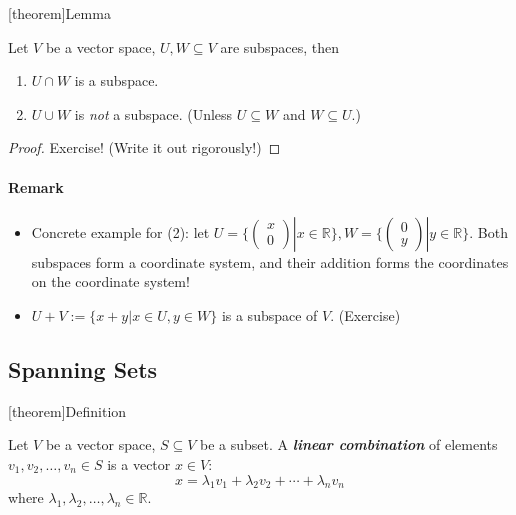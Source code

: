 \documentclass[12pt]{report}
\theoremstyle{definition}
\begin{document}
[theorem]{Lemma}
\begin{union and intersection of subspaces}
    Let $V$ be a vector space, $U, W \subseteq V$ are subspaces, then
    \begin{enumerate}[label = (\arabic*)]
        \item $U \cap W$ is a subspace.
        \item $U \cup W$ is \emph{not} a subspace.
            (Unless $U \subseteq W$ and $W \subseteq U$.)
    \end{enumerate}
\end{union and intersection of subspaces}

\begin{proof}
    Exercise! (Write it out rigorously!)
\end{proof}

\paragraph{Remark}
\begin{itemize}
        \item 
    Concrete example for (2): let $U = \{\begin{pmatrix}
            x \\
            0
    \end{pmatrix} | x \in \mathbb{R}\}, W = \{\begin{pmatrix}
            0 \\
            y
    \end{pmatrix} | y \in \mathbb{R}\}$. Both subspaces form a coordinate system,
    and their addition forms the coordinates on the coordinate system!

    \item $U + V := \{x + y | x \in U, y \in W\}$ is a subspace of $V$. (Exercise)
\end{itemize}

\subsection{Spanning Sets}

[theorem]{Definition}
\begin{spanning sets}
    Let $V$ be a vector space, $S \subseteq V$ be a subset.
    A \textbf{\emph{linear combination}} of elements $v_1, v_2, \ldots, v_n \in S$ is a vector $x \in V$:\[
        x = \lambda_1 v_1 + \lambda_2 v_2 + \cdots + \lambda_n v_n
    \]where $\lambda_1, \lambda_2, \ldots, \lambda_n \in \mathbb{R}$.
\end{spanning sets}
\end{document}
